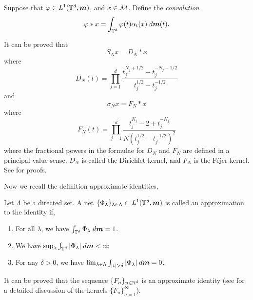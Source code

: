 \begin{definition}
    Suppose that $\varphi \in L^1(\mathbb{T}^d,\boldsymbol{m})$, and $x \in \mathcal{M}$. Define the \emph{convolution}
    \begin{equation}
        \varphi * x = \int_{\mathbb{T}^d} \varphi(t)\alpha_t(x)\;d\boldsymbol{m}(t).
    \end{equation}
\end{definition}

It can be proved that
\begin{equation}
    S_N x = D_N * x
\end{equation}
where 
\begin{equation}
    D_N(t) = \prod_{j=1}^d\frac{t_j^{N_j+1/2}-t_j^{-N_j-1/2}}{t_j^{1/2}-t_j^{-1/2}}
\end{equation}
and
\begin{equation}
    \sigma_N x = F_N*x
\end{equation}
where
\begin{equation}
    F_N(t) = \prod_{j=1}^d\frac{t_j^{N_j}-2+t_j^{-N_j}}{N(t_j^{1/2}-t_j^{-1/2})^2}
\end{equation}
where the fractional powers in the formulae for $D_N$ and $F_N$ are defined
in a principal value sense. $D_N$
is called the Dirichlet kernel, and $F_N$ is the F\'ejer kernel. See \cite{katznelson} for proofs.

Now we recall the definition approximate identities,
\begin{definition}
    Let $\Lambda$ be a directed set.
    A net $\{\Phi_\lambda\}_{\lambda \in \Lambda} \subset L^1(\mathbb{T}^d,\boldsymbol{m})$ is called
    an approximation to the identity if,
    \begin{enumerate}
        \item{} For all $\lambda$, we have $\int_{\mathbb{T}^d} \Phi_\lambda \;d\boldsymbol{m} = 1$.
        \item{} We have $\sup_{\lambda} \int_{\mathbb{T}^d} |\Phi_\lambda|\;d\boldsymbol{m} < \infty$
        \item{} For any $\delta > 0$, we have $\lim_{\lambda \in \Lambda} \int_{|t| > \delta} |\Phi_\lambda|\;d\boldsymbol{m} = 0$.
    \end{enumerate}
\end{definition}

It can be proved that the sequence $\{F_n\}_{n\in\mathbb{N}^d}$ is an approximate
identity (see \cite{Grafakos1} for a detailed discussion of the kernels $\{F_n\}_{n=1}^\infty$).

